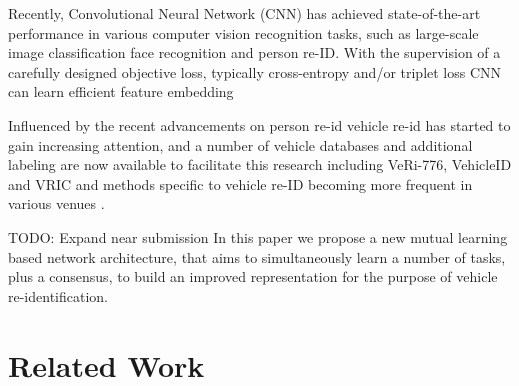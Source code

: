 \documentclass[10pt,twocolumn,letterpaper]{article}
\newcommand{\todo}[1]{}
\renewcommand{\todo}[1]{{\color{red} TODO: {#1}}}
\begin{document}
Recently, Convolutional Neural Network (CNN) has achieved state-of-the-art
performance in various computer vision 
recognition tasks, such as large-scale image classification 
face recognition  and person re-ID.
With the supervision of a carefully designed objective loss, typically
cross-entropy and/or triplet loss
CNN can learn efficient feature embedding

Influenced by the recent advancements on person re-id vehicle re-id has started
to gain increasing attention, 
and a number of vehicle databases and additional labeling are now available to
facilitate this research
 including 
 VeRi-776\cite{Liu2016icme-veri, Liu2016eccv_veri},
 VehicleID\cite{liu2016vehicleid} and VRIC\cite{kanaci2018vehicle} and methods
 specific to vehicle re-ID becoming more frequent in various venues
 \cite{wang2017orientation, Shen_2017_ICCV, Zhou2018VAMI}.  

\todo{Expand near submission}
In this paper we propose a new mutual learning based network architecture, that
aims to simultaneously learn a number of tasks, plus a consensus, to build an
improved representation for the purpose of vehicle re-identification.

\section{Related Work}
\end{document}
